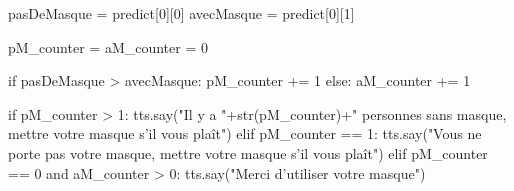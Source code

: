\documentclass{cubeamer}
\newcommand{\tab}{\- \- \- \-}
\begin{document}
\begin{frame}[fragile]
\begin{semiverbatim}
pasDeMasque = predict[0][0]
avecMasque = predict[0][1]

pM_counter = aM_counter = 0

if pasDeMasque > avecMasque:
\tab pM_counter += 1
else:
\tab aM_counter += 1
\end{semiverbatim}
\end{frame}

\begin{frame}[fragile]
\begin{semiverbatim}
if pM_counter > 1:
\tab tts.say("Il y a "+str(pM_counter)+" personnes sans masque, mettre votre masque s'il vous plaît")
elif pM_counter == 1:
\tab tts.say("Vous ne porte pas votre masque, mettre votre masque s'il vous plaît")
elif pM_counter == 0 and aM_counter > 0:
\tab tts.say("Merci d'utiliser votre masque") 
\end{semiverbatim}	
\end{frame}
\end{document}
